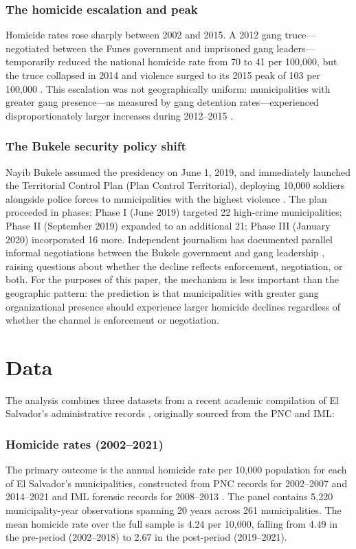\documentclass[12pt]{article}
\begin{document}
\subsubsection*{The homicide escalation and peak} Homicide rates rose sharply between 2002 and 2015. A 2012 gang truce---negotiated between the Funes government and imprisoned gang leaders---temporarily reduced the national homicide rate from 70 to 41 per 100,000, but the truce collapsed in 2014 and violence surged to its 2015 peak of 103 per 100,000 \citep{Bargent2015}. This escalation was not geographically uniform: municipalities with greater gang presence---as measured by gang detention rates---experienced disproportionately larger increases during 2012--2015 \citep{Carcach2025}.

\subsubsection*{The Bukele security policy shift} Nayib Bukele assumed the presidency on June 1, 2019, and immediately launched the Territorial Control Plan (Plan Control Territorial), deploying 10,000 soldiers alongside police forces to municipalities with the highest violence \citep{Crisis2020}. The plan proceeded in phases: Phase I (June 2019) targeted 22 high-crime municipalities; Phase II (September 2019) expanded to an additional 21; Phase III (January 2020) incorporated 16 more. Independent journalism has documented parallel informal negotiations between the Bukele government and gang leadership \citep{Martinez2020}, raising questions about whether the decline reflects enforcement, negotiation, or both. For the purposes of this paper, the mechanism is less important than the geographic pattern: the prediction is that municipalities with greater gang organizational presence should experience larger homicide declines regardless of whether the channel is enforcement or negotiation.

\section{Data}

The analysis combines three datasets from a recent academic compilation of El Salvador's administrative records \citep{Carcach2025}, originally sourced from the PNC and IML:

\subsubsection*{Homicide rates (2002--2021)} The primary outcome is the annual homicide rate per 10,000 population for each of El Salvador's municipalities, constructed from PNC records for 2002--2007 and 2014--2021 and IML forensic records for 2008--2013 \citep{Carcach2025}. The panel contains 5,220 municipality-year observations spanning 20 years across 261 municipalities. The mean homicide rate over the full sample is 4.24 per 10,000, falling from 4.49 in the pre-period (2002--2018) to 2.67 in the post-period (2019--2021).
\end{document}

